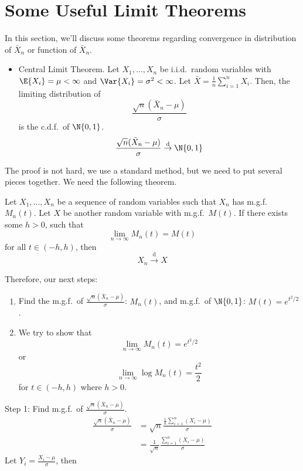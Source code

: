 \section{Some Useful Limit Theorems}
In this section, we'll discuss some theorems
regarding convergence in distribution of $ \bar{X}_n $
or function of $ \bar{X}_n $.
\begin{itemize}
    \item Central Limit Theorem. Let $ X_1,\ldots,X_n $
          be i.i.d.\ random variables with $ \E{X_i}=\mu<\infty $
          and $ \Var{X_i}=\sigma^2<\infty $. Let
          $ \bar{X}=\frac{1}{n} \sum_{i=1}^{n} X_i $. Then,
          the limiting distribution of
          \[ \frac{\sqrt{n}(\bar{X}_n-\mu)}{\sigma} \]
          is the c.d.f.\ of $ \N{0,1} $.
          \[  \frac{\sqrt{n}(\bar{X}_n-\mu)}{\sigma}
              \stackrel{\text{d}}{\to}\N{0,1} \]
\end{itemize}
The proof is not hard, we use a standard method,
but we need to put several pieces together.
We need the following theorem.
\begin{Theorem}{}{}
    Let $ X_1,\ldots,X_n $ be a sequence of
    random variables such that $ X_n $ has
    m.g.f.\ $ M_n(t) $. Let $ X $
    be another random variable with m.g.f.\
    $ M(t) $. If there exists some $ h>0 $, such that
    \[ \lim\limits_{{n} \to {\infty}} M_n(t)=M(t) \]
    for all $ t\in(-h,h) $, then
    \[ X_n \stackrel{\text{d}}{\to} X \]
\end{Theorem}
Therefore, our next steps:
\begin{enumerate}[label=(\arabic*)]
    \item Find the m.g.f.\ of
          $ \frac{\sqrt{n}(\bar{X}_n-\mu)}{\sigma} $: $ M_n(t) $,
          and m.g.f.\ of $ \N{0,1} $: $ M(t)=e^{t^2/2} $.
    \item We try to show that
          \[ \lim\limits_{{n} \to {\infty}}M_n(t)=e^{t^2/2}  \]
          or
          \[ \lim\limits_{{n} \to {\infty}} \log{M_n(t)}=\frac{t^2}{2} \]
          for $ t\in(-h,h) $ where $ h>0 $.
\end{enumerate}
Step 1: Find m.g.f.\ of $ \displaystyle \frac{\sqrt{n}(\bar{X}_n-\mu)}{\sigma} $.
\begin{align*}
    \frac{\sqrt{n}(\bar{X}_n-\mu)}{\sigma}
     & =\sqrt{n}\frac{\frac{1}{n} \sum_{i=1}^{n} (X_i-\mu)}{\sigma} \\
     & =\frac{1}{\sqrt{n}} \frac{\sum_{i=1}^{n} (X_i-\mu)}{\sigma}
\end{align*}
Let $ \displaystyle Y_i=\frac{X_i-\mu}{\sigma} $, then
